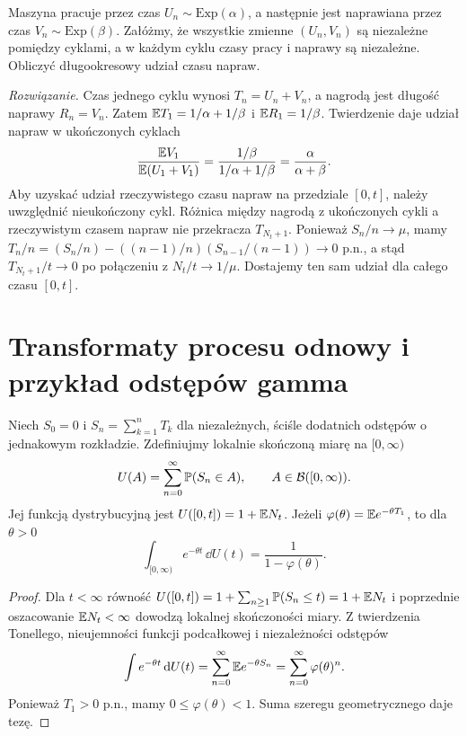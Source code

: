\begin{zadanie}
Maszyna pracuje przez czas $U_n\sim\mathrm{Exp}(\alpha)$,
a następnie jest naprawiana przez czas
$V_n\sim\mathrm{Exp}(\beta)$. Załóżmy, że wszystkie
zmienne $(U_n,V_n)$ są niezależne pomiędzy cyklami,
a w każdym cyklu czasy pracy i naprawy są niezależne.
Obliczyć długookresowy udział czasu napraw.

\emph{Rozwiązanie.} Czas jednego cyklu wynosi
$T_n=U_n+V_n$, a nagrodą jest długość naprawy $R_n=V_n$.
Zatem $\mathbb{E} T_1=1/\alpha+1/\beta$ i $\mathbb{E} R_1=1/\beta$.
Twierdzenie daje udział napraw w ukończonych cyklach
\[
\frac{\mathbb{E} V_1}{\mathbb{E}(U_1+V_1)}
=\frac{1/\beta}{1/\alpha+1/\beta}
=\frac{\alpha}{\alpha+\beta}.
\]
Aby uzyskać udział rzeczywistego czasu napraw na przedziale
$[0,t]$, należy uwzględnić nieukończony cykl. Różnica
między nagrodą z ukończonych cykli a rzeczywistym czasem
napraw nie przekracza $T_{N_t+1}$. Ponieważ
$S_n/n\to\mu$, mamy
$T_n/n=(S_n/n)-((n-1)/n)(S_{n-1}/(n-1))\to0$ p.n.,
a stąd $T_{N_t+1}/t\to0$ po połączeniu z $N_t/t\to1/\mu$.
Dostajemy ten sam udział dla całego czasu $[0,t]$.
\end{zadanie}


\section{Transformaty procesu odnowy i przykład odstępów gamma}
\begin{twierdzenie}
Niech $S_0=0$ i $S_n=\sum_{k=1}^nT_k$ dla niezależnych,
ściśle dodatnich odstępów o jednakowym rozkładzie.
Zdefiniujmy lokalnie skończoną miarę na $[0,\infty)$
\[
U(A)=\sum_{n=0}^\infty\mathbb{P}(S_n\in A),\qquad
A\in\mathcal{B}([0,\infty)).
\]
Jej funkcją dystrybucyjną jest $U([0,t])=1+\mathbb{E} N_t$.
Jeżeli $\varphi(\theta)=\mathbb{E} e^{-\theta T_1}$, to dla $\theta>0$
\[
\int_{[0,\infty)}e^{-\theta t}\,\dd U(t)
=\frac{1}{1-\varphi(\theta)}.
\]
\end{twierdzenie}
\begin{proof}
Dla $t<\infty$ równość
$U([0,t])=1+\sum_{n\ge1}\mathbb{P}(S_n\le t)=1+\mathbb{E} N_t$
i poprzednie oszacowanie $\mathbb{E} N_t<\infty$ dowodzą
lokalnej skończoności miary. Z twierdzenia Tonellego,
nieujemności funkcji podcałkowej i niezależności odstępów
\[
\int e^{-\theta t}\,\mathrm{d} U(t)
=\sum_{n=0}^\infty\mathbb{E} e^{-\theta S_n}
=\sum_{n=0}^\infty \varphi(\theta)^n.
\]
Ponieważ $T_1>0$ p.n., mamy $0\le\varphi(\theta)<1$.
Suma szeregu geometrycznego daje tezę.
\end{proof}

